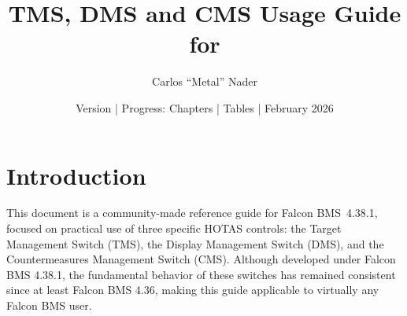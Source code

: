 \documentclass[11pt, a4paper, twoside]{report}
\title{TMS, DMS and CMS Usage Guide for \bmsver}
\author{Carlos ``Metal'' Nader}
\date{Version \fulldocversion{} | Progress: Chapters \chapterscompletedof{} | Tables \tablesfilledpct{} | February 2026}
\providecommand{\bmsver}{Falcon BMS~4.38.1}
\begin{document}
\maketitle


\setcounter{tocdepth}{3}       %
\setcounter{secnumdepth}{3}    %

\newpage
\tableofcontents
\newpage
{}

\chapter{Introduction}
\label{chap:C1}

This document is a community-made reference guide for \bmsver, focused on practical use of three specific HOTAS controls: the Target Management Switch (TMS), the Display Management Switch (DMS), and the Countermeasures Management Switch (CMS). Although developed under Falcon BMS 4.38.1, the fundamental behavior of these switches has remained consistent since at least Falcon BMS 4.36, making this guide applicable to virtually any Falcon BMS user.
\end{document}
